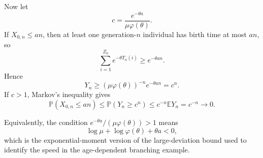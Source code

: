 \documentclass[11pt]{article}
\newcommand{\Prob}{\mathbb{P}}
\newcommand{\E}{\mathbb{E}}
\newcommand{\1}{\mathbf{1}}
\begin{document}
Now let
\[
  c=\frac{e^{-\theta a}}{\mu\varphi(\theta)}.
\]
If $X_{0,n}\le an$, then at least one generation-$n$ individual has
birth time at most $an$, so
\[
  \sum_{i=1}^{Z_n}e^{-\theta T_n(i)}\ge e^{-\theta an}.
\]
Hence
\[
  Y_n\ge (\mu\varphi(\theta))^{-n}e^{-\theta an}=c^n.
\]
If $c>1$, Markov's inequality gives
\[
  \Prob(X_{0,n}\le an)
  \le \Prob(Y_n\ge c^n)
  \le c^{-n}\E Y_n
  =c^{-n}\to0.
\]

Equivalently, the condition $e^{-\theta a}/(\mu\varphi(\theta))>1$
means
\[
  \log\mu+\log\varphi(\theta)+\theta a<0,
\]
which is the exponential-moment version of the large-deviation bound
used to identify the speed in the age-dependent branching example.
\end{document}
